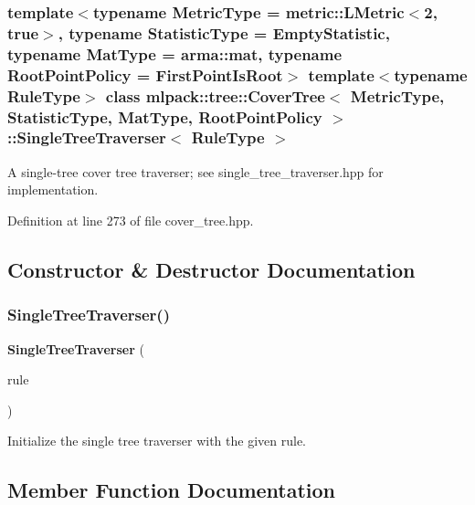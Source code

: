 \subsubsection*{template$<$typename Metric\+Type = metric\+::\+L\+Metric$<$2, true$>$, typename Statistic\+Type = Empty\+Statistic, typename Mat\+Type = arma\+::mat, typename Root\+Point\+Policy = First\+Point\+Is\+Root$>$\newline
template$<$typename Rule\+Type$>$\newline
class mlpack\+::tree\+::\+Cover\+Tree$<$ Metric\+Type, Statistic\+Type, Mat\+Type, Root\+Point\+Policy $>$\+::\+Single\+Tree\+Traverser$<$ Rule\+Type $>$}

A single-\/tree cover tree traverser; see single\+\_\+tree\+\_\+traverser.\+hpp for implementation. 



Definition at line 273 of file cover\+\_\+tree.\+hpp.



\subsection{Constructor \& Destructor Documentation}
\mbox{\label{classmlpack_1_1tree_1_1CoverTree_1_1SingleTreeTraverser_aef3b0527dc7ff514b7b658b1108abae9}} 
\subsubsection{Single\+Tree\+Traverser()}
{\footnotesize\ttfamily \textbf{ Single\+Tree\+Traverser} (\begin{DoxyParamCaption}\item[{Rule\+Type \&}]{rule }\end{DoxyParamCaption})}



Initialize the single tree traverser with the given rule. 



\subsection{Member Function Documentation}
\mbox{\label{classmlpack_1_1tree_1_1CoverTree_1_1SingleTreeTraverser_ac2f6072011ee31a0a32f62e2a105a347}} 
